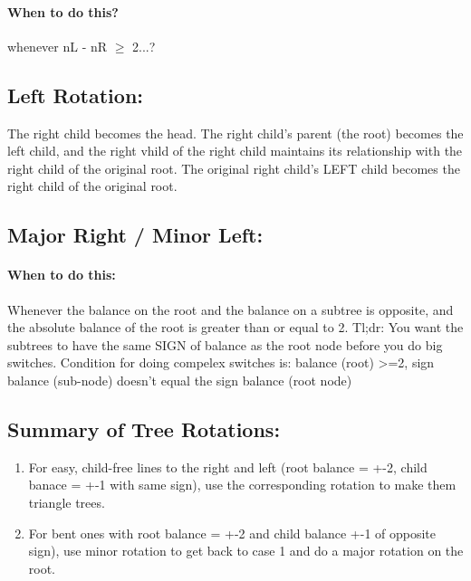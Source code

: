 \documentclass[a4paper,12pt]{report}
\begin{document}
\paragraph{When to do this? } whenever nL - nR $\geq$ 2...?

\subsection{Left Rotation: }
The right child becomes the head. The right child's parent (the root) becomes the left child, and the right vhild of the right child maintains its relationship with the right child of the original root. The original right child's LEFT child becomes the right child of the original root. 

\subsection{Major Right / Minor Left: }
\paragraph{When to do this: } Whenever the balance on the root and the balance on a subtree is opposite, and the absolute balance of the root is greater than or equal to 2. Tl;dr: You want the subtrees to have the same SIGN of balance as the root node before you do big switches. Condition for doing compelex switches is: balance (root) >=2, sign balance (sub-node) doesn't equal the sign balance (root node)

\subsection{Summary of Tree Rotations: }
\begin{enumerate}
\item For easy, child-free lines to the right and left (root balance = +-2, child banace = +-1 with same sign), use the corresponding rotation to make them triangle trees.
\item For bent ones with root balance = +-2 and child balance +-1 of opposite sign), use minor rotation to get back to case 1 and do a major rotation on the root. 
\end{enumerate}
\end{document}
